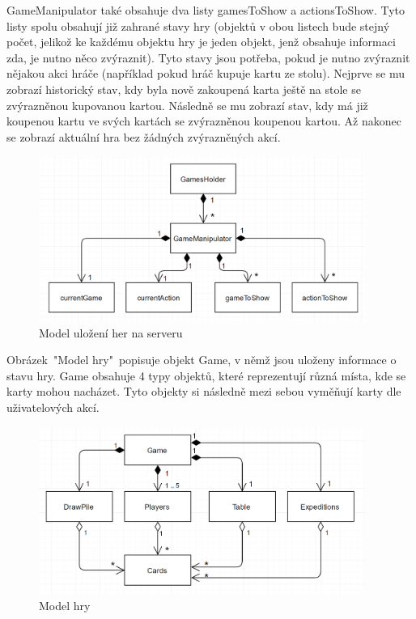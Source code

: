 \documentclass[czech,master,public,dept460,male,cpdeclaration,twoside]{diploma}
\begin{document}
GameManipulator také obsahuje dva listy gamesToShow a actionsToShow. Tyto listy spolu obsahují již zahrané stavy hry (objektů v obou listech bude stejný počet, jelikož ke každému objektu hry je jeden objekt, jenž obsahuje informaci zda, je nutno něco zvýraznit). Tyto stavy jsou potřeba, pokud je nutno zvýraznit nějakou akci hráče (například pokud hráč kupuje kartu ze stolu). Nejprve se mu zobrazí historický stav, kdy byla nově zakoupená karta ještě na stole se zvýrazněnou kupovanou kartou. Následně se mu zobrazí stav, kdy má již koupenou kartu ve svých kartách se zvýrazněnou koupenou kartou. Až nakonec se zobrazí aktuální hra bez žádných zvýrazněných akcí.

\begin{figure}[H]
\centering\includegraphics[width=0.95\textwidth]{Figures/GameManipulator.png}\caption{Model uložení her na serveru}
\end{figure}

Obrázek~"Model hry"~popisuje objekt Game, v němž jsou uloženy informace o stavu hry. Game obsahuje 4 typy objektů, které reprezentují různá místa, kde se karty mohou nacházet. Tyto objekty si následně mezi sebou vyměňují karty dle uživatelových akcí.

\begin{figure}[H]
\centering\includegraphics[width=0.95\textwidth]{Figures/Game.png}\caption{Model hry}
\end{figure}
\end{document}
